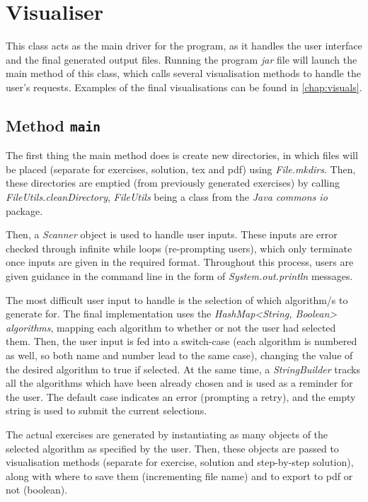 \documentclass{l4proj}
\begin{document}
\section{Visualiser}

This class acts as the main driver for the program, as it handles the user interface and the final generated output files. Running the program \emph{jar} file will launch the main method of this class, which calls several visualisation methods to handle the user's requests. Examples of the final visualisations can be found in \autoref{chap:visuals}.

\subsection{Method \texttt{main}}

The first thing the main method does is create new directories, in which files will be placed (separate for exercises, solution, tex and pdf) using \emph{File.mkdirs}. Then, these directories are emptied (from previously generated exercises) by calling \emph{FileUtils.cleanDirectory}, \emph{FileUtils} being a class from the \emph{Java commons io} package.

Then, a \emph{Scanner} object is used to handle user inputs. These inputs are error checked through infinite while loops (re-prompting users), which only terminate once inputs are given in the required format. Throughout this process, users are given guidance in the command line in the form of \emph{System.out.println} messages.

The most difficult user input to handle is the selection of which algorithm/s to generate for. The final implementation uses the \emph{HashMap<String, Boolean> algorithms}, mapping each algorithm to whether or not the user had selected them. Then, the user input is fed into a switch-case (each algorithm is numbered as well, so both name and number lead to the same case), changing the value of the desired algorithm to true if selected. At the same time, a \emph{StringBuilder} tracks all the algorithms which have been already chosen and is used as a reminder for the user. The default case indicates an error (prompting a retry), and the empty string is used to submit the current selections.

The actual exercises are generated by instantiating as many objects of the selected algorithm as specified by the user. Then, these objects are passed to visualisation methods (separate for exercise, solution and step-by-step solution), along with where to save them (incrementing file name) and to export to pdf or not (boolean).
\end{document}
